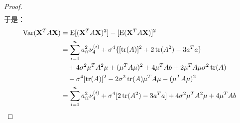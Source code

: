 \begin{proof}
\begin{align*}
	\end{align*}
	于是：
	\begin{align*}
		\operatorname{Var}(\mathbf{X}^TA\mathbf{X})
		&=\operatorname{E}[(\mathbf{X}^TA\mathbf{X})^2]-[\operatorname{E}(\mathbf{X}^TA\mathbf{X})]^2 \\
		&=\sum_{i=1}^{n}a_{ii}^2\nu_4^{(i)}+\sigma^4\{[\operatorname{tr}(A)]^2+2\operatorname{tr}(A^2)-3a^Ta\} \\
		&\quad+4\sigma^2\mu^TA^2\mu+(\mu^TA\mu)^2+4\mu^TAb+2\mu^TA\mu\sigma^2\operatorname{tr}(A) \\
		&\quad-\sigma^4[\operatorname{tr}(A)]^2-2\sigma^2\operatorname{tr}(A)\mu^TA\mu-(\mu^TA\mu)^2 \\
		&=\sum_{i=1}^{n}a_{ii}^2\nu_4^{(i)}+\sigma^4[2\operatorname{tr}(A^2)-3a^Ta]+4\sigma^2\mu^TA^2\mu+4\mu^TAb\qedhere
	\end{align*}
\end{proof}

